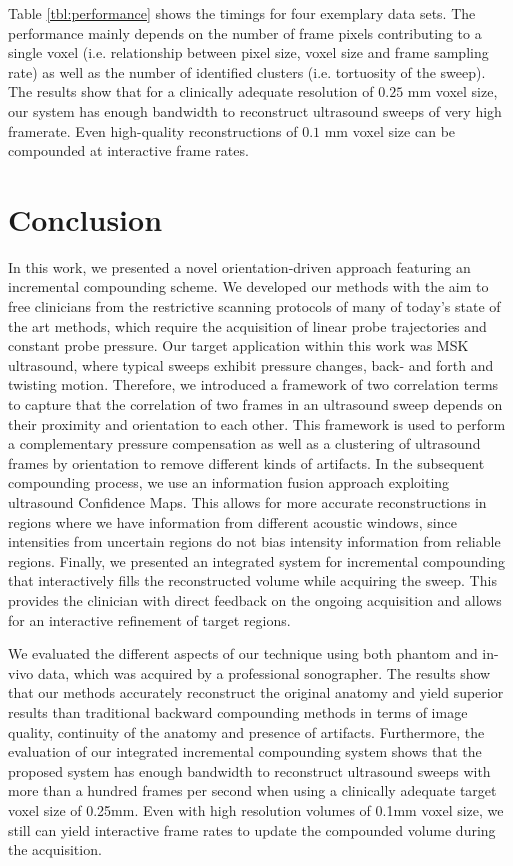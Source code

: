 Table \ref{tbl:performance} shows the timings for four exemplary data sets.
The performance mainly depends on the number of frame pixels contributing to a single voxel (i.e. relationship between pixel size, voxel size and frame sampling rate) as well as the number of identified clusters (i.e. tortuosity of the sweep).
The results show that for a clinically adequate resolution of $0.25$ mm voxel size, our system has enough bandwidth to reconstruct ultrasound sweeps of very high framerate.
Even high-quality reconstructions of $0.1$ mm voxel size can be compounded at interactive frame rates.


\section{Conclusion}
In this work, we presented a novel orientation-driven approach featuring an incremental compounding scheme. 
We developed our methods with the aim to free clinicians from the restrictive scanning protocols of many of today's state of the art methods, which require the acquisition of linear probe trajectories and constant probe pressure.
Our target application within this work was MSK ultrasound, where typical sweeps exhibit pressure changes, back- and forth and twisting motion.
Therefore, we introduced a framework of two correlation terms to capture that the correlation of two frames in an ultrasound sweep depends on their proximity and orientation to each other.
This framework is used to perform a complementary pressure compensation as well as a clustering of ultrasound frames by orientation to remove different kinds of artifacts.
In the subsequent compounding process, we use an information fusion approach exploiting ultrasound Confidence Maps.
This allows for more accurate reconstructions in regions where we have information from different acoustic windows, since intensities from uncertain regions do not bias intensity information from reliable regions.
Finally, we presented an integrated system for incremental compounding that interactively fills the reconstructed volume while acquiring the sweep.
This provides the clinician with direct feedback on the ongoing acquisition and allows for an interactive refinement of target regions.


We evaluated the different aspects of our technique using both phantom and in-vivo data, which was acquired by a professional sonographer.
The results show that our methods accurately reconstruct the original anatomy and yield superior results than traditional backward compounding methods in terms of image quality, continuity of the anatomy and presence of artifacts.
Furthermore, the evaluation of our integrated incremental compounding system shows that the proposed system has enough bandwidth to reconstruct ultrasound sweeps with more than a hundred frames per second when using a clinically adequate target voxel size of 0.25mm.
Even with high resolution volumes of 0.1mm voxel size, we still can yield interactive frame rates to update the compounded volume during the acquisition.

